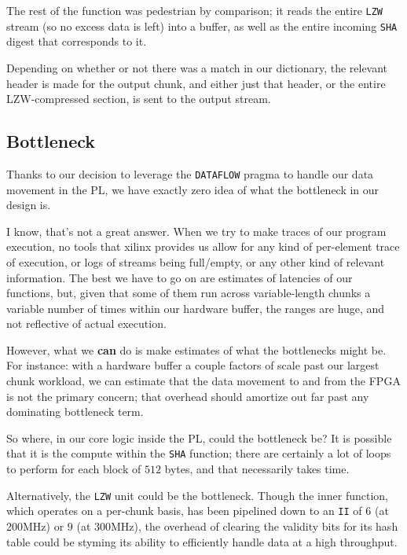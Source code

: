 \documentclass{article}
\begin{document}
\newline\par
The rest of the function was pedestrian by comparison; it reads the entire \texttt{LZW} stream (so no excess data is left) into a buffer,
as well as the entire incoming \texttt{SHA} digest that corresponds to it.
\par
Depending on whether or not there was a match in our dictionary, the relevant header is made for the output chunk,
and either just that header, or the entire LZW-compressed section, is sent to the output stream.


\subsection{Bottleneck}

Thanks to our decision to leverage the \texttt{DATAFLOW} pragma to handle our data movement in the PL, we have exactly zero idea of what the bottleneck in our design is.
\par
I know, that's not a great answer. When we try to make traces of our program execution, no tools that xilinx provides us allow for any kind of per-element trace of execution, or logs of streams being full/empty, or any other kind of relevant information. The best we have to go on are estimates of latencies of our functions, but, given that some of them run across variable-length chunks a variable number of times within our hardware buffer, the ranges are huge, and not reflective of actual execution.
\newline\par
However, what we \textbf{can} do is make estimates of what the bottlenecks might be. For instance: with a hardware buffer a couple factors of scale past our largest chunk workload, we can estimate that the data movement to and from the FPGA is not the primary concern; that overhead should amortize out far past any dominating bottleneck term.
\newline\par
So where, in our core logic inside the PL, could the bottleneck be? It is possible that it is the compute within the \texttt{SHA} function; there are certainly a lot of loops to perform for each block of $512$ bytes, and that necessarily takes time.
\par
Alternatively, the \texttt{LZW} unit could be the bottleneck. Though the inner function, which operates on a per-chunk basis, has been pipelined down to an \texttt{II} of $6$ (at 200MHz) or $9$ (at 300MHz), the overhead of clearing the validity bits for its hash table could be styming its ability to efficiently handle data at a high throughput.
\end{document}
